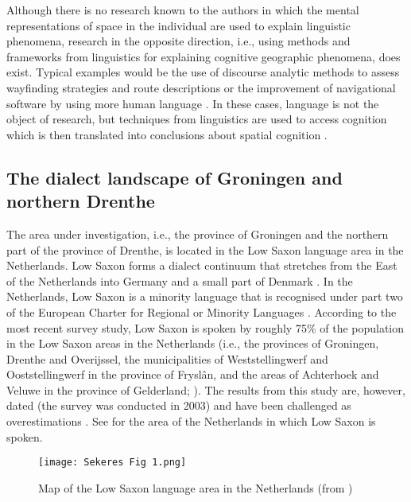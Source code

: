 \documentclass[output=paper,colorlinks,citecolor=brown,draft]{langscibook}
\begin{document}
Although there is no research known to the authors in which the mental representations of space in the individual are used to explain linguistic phenomena, research in the opposite direction, i.e., using methods and frameworks from linguistics for explaining cognitive geographic phenomena, does exist. Typical examples would be the use of discourse analytic methods to assess wayfinding strategies and route descriptions \citep[e.g.,][]{holscher_would_2011} or the improvement of navigational software by using more human language \citep[e.g.,][]{baltaretu_improving_2015}. In these cases, language is not the object of research, but techniques from linguistics are used to access cognition which is then translated into conclusions about spatial cognition \citep[see][]{tenbrink_cognitive_2020}.

\subsection{The dialect landscape of Groningen and northern Drenthe}
The area under investigation, i.e., the province of Groningen and the northern part of the province of Drenthe, is located in the Low Saxon language area in the Netherlands. Low Saxon forms a dialect continuum that stretches from the East of the Netherlands into Germany and a small part of Denmark \citep{gooskens_cross-border_2009}. In the Netherlands, Low Saxon is a minority language that is recognised under part two of the European Charter for Regional or Minority Languages \citep{noauthor_europees_1998}. According to the most recent survey study, Low Saxon is spoken by roughly 75\% of the population in the Low Saxon areas in the Netherlands (i.e., the provinces of Groningen, Drenthe and Overijssel, the municipalities of Weststellingwerf and Ooststellingwerf in the province of Fryslân, and the areas of Achterhoek and Veluwe in the province of Gelderland; \citealp{bloemhoff_taaltelling_2005}). The results from this study are, however, dated (the survey was conducted in 2003) and have been challenged as overestimations \citep{versloot_streektaaldood_2020, goeman_dimensions_2009}. See  for the area of the Netherlands in which Low Saxon is spoken. 

\begin{figure}[t]
    \texttt{[image: Sekeres Fig 1.png]}
    \caption{\label{fig:mapls}Map of the Low Saxon language area in the Netherlands (from \citealt{bloemhoff_introduction_2020})}   
\end{figure}
\end{document}
